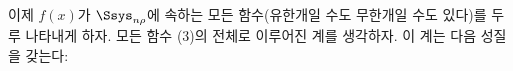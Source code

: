 
이제 $f(x)$가 $\Ssys_{n\rho}$에 속하는 모든 함수(유한개일 수도 무한개일 수도 있다)를 두루 나타내게 하자. 모든 함수 (3)의 전체로 이루어진 계를 생각하자. 이 계는 다음 성질을 갖는다:
